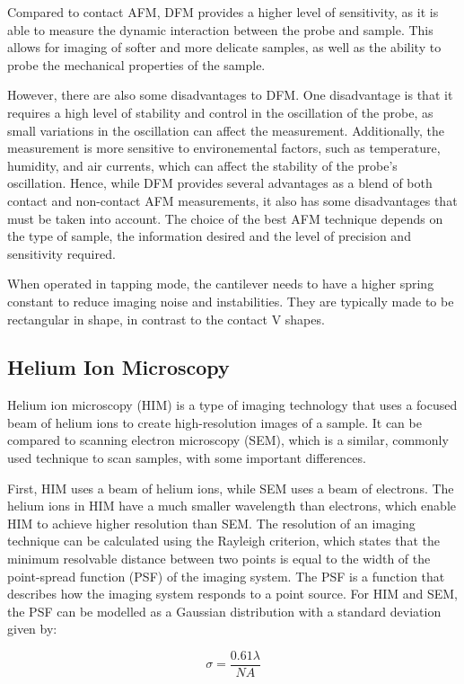 Compared to contact AFM, DFM provides a higher level of sensitivity, as it is able to measure the dynamic interaction between the probe and sample. This allows for imaging of softer and more delicate samples, as well as the ability to probe the mechanical properties of the sample.

However, there are also some disadvantages to DFM. One disadvantage is that it requires a high level of stability and control in the oscillation of the probe, as small variations in the oscillation can affect the measurement. Additionally, the measurement is more sensitive to environemental factors, such as temperature, humidity, and air currents, which can affect the stability of the probe's oscillation. Hence, while DFM provides several advantages as a blend of both contact and non-contact AFM measurements, it also has some disadvantages that must be taken into account. The choice of the best AFM technique depends on the type of sample, the information desired and the level of precision and sensitivity required.

When operated in tapping mode, the cantilever needs to have a higher spring constant to reduce imaging noise and instabilities. They are typically made to be rectangular in shape, in contrast to the contact V shapes.  
\subsection{Helium Ion Microscopy}
\label{subsec:him}
Helium ion microscopy (HIM) is a type of imaging technology that uses a focused beam of helium ions to create high-resolution images of a sample. It can be compared to scanning electron microscopy (SEM), which is a similar, commonly used technique to scan samples, with some important differences.

First, HIM uses a beam of helium ions, while SEM uses a beam of electrons. The helium ions in HIM have a much smaller wavelength than electrons, which enable HIM to achieve higher resolution than SEM. The resolution of an imaging technique can be calculated using the Rayleigh criterion, which states that the minimum resolvable distance between two points is equal to the width of the point-spread function (PSF) of the imaging system. The PSF is a function that describes how the imaging system responds to a point source. For HIM and SEM, the PSF can be modelled as a Gaussian distribution with a standard deviation given by:

\begin{equation}
    \sigma = \frac{0.61\lambda}{NA}
    \label{eq:PSF_standard_deviation}
\end{equation}

